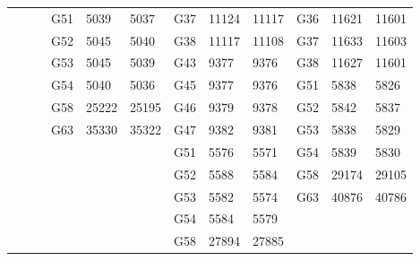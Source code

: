 \documentclass[12pt, a4paper]{article}%
\numberwithin{equation}{section}
\theoremstyle{plain}
\begin{document}
{\begin{landscape}
\begin{longtable}{|lll|lll|lll|lll|}
						&          &          & G51      & 5039     & 5037     & G37      & 11124    & 11117    & G36      & 11621    & 11601    \\
						&          &          & G52      & 5045     & 5040     & G38      & 11117    & 11108    & G37      & 11633    & 11603    \\
						&          &          & G53      & 5045     & 5039     & G43      & 9377     & 9376     & G38      & 11627    & 11601    \\
						&          &          & G54      & 5040     & 5036     & G45      & 9377     & 9376     & G51      & 5838     & 5826     \\
						&          &          & G58      & 25222    & 25195    & G46      & 9379     & 9378     & G52      & 5842     & 5837     \\
						&          &          & G63      & 35330    & 35322    & G47      & 9382     & 9381     & G53      & 5838     & 5829     \\
						&          &          &          &          &          & G51      & 5576     & 5571     & G54      & 5839     & 5830     \\
						&          &          &          &          &          & G52      & 5588     & 5584     & G58      & 29174    & 29105    \\
						&          &          &          &          &          & G53      & 5582     & 5574     & G63      & 40876    & 40786    \\
						&          &          &          &          &          & G54      & 5584     & 5579     &          &          &          \\
						&          &          &          &          &          & G58      & 27894    & 27885    &          &          &          \\ \hline
					\end{longtable}
                    					\end{landscape}

				}
				
				
				
				
\end{document}

